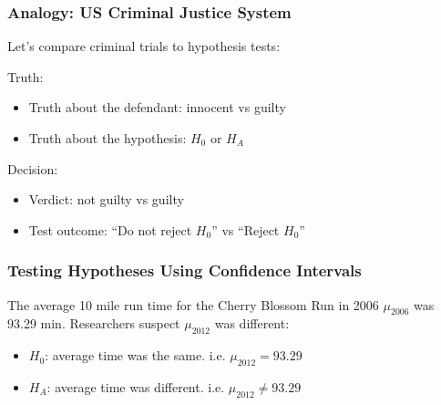 \documentclass[slides]{beamer}
\newcommand{\blue}[1]{\textcolor{blue2}{#1}}
\newcommand{\xbar}{\overline{x}}
\begin{document}
\begin{frame}
\frametitle{Analogy:  US Criminal Justice System}

Let's compare criminal trials to hypothesis tests:

\vspace{0.5cm}

\pause \blue{Truth}:
\begin{itemize}
\item Truth about the defendant: innocent vs guilty
\item Truth about the hypothesis: $H_0$ or $H_A$
\end{itemize}

\vspace{0.25cm}

\pause \blue{Decision}:
\begin{itemize}
\item Verdict:  not guilty vs guilty
\item Test outcome: ``Do not reject $H_0$'' vs ``Reject $H_0$''
\end{itemize}

\end{frame}


\begin{frame}
\frametitle{Testing Hypotheses Using Confidence Intervals}
The average 10 mile run time for the Cherry Blossom Run in 2006 $\mu_{2006}$ was 93.29 min.  Researchers suspect $\mu_{2012}$ was different:
\pause\begin{itemize}
\item $H_0$: average time was the same. i.e. $\mu_{2012} = 93.29$
\item $H_A$: average time was different. i.e. $\mu_{2012} \neq 93.29$
\end{itemize}

%
%
%
%
%
%
%

\end{frame}
\end{document}
